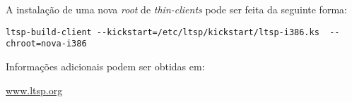 A instalação de uma nova \emph{root} de \emph{thin-clients} pode ser feita da seguinte forma:

\begin{Verbatim}[commandchars=\\\{\}]
ltsp-build-client --kickstart=/etc/ltsp/kickstart/ltsp-i386.ks  --chroot=nova-i386
\end{Verbatim}

Informações adicionais podem ser obtidas em:\\ \begin{normalsize}\sffamily\href{http://www.ltsp.org}{www.ltsp.org}\end{normalsize}

